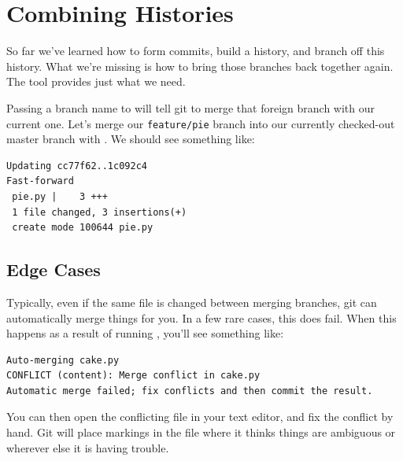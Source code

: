 \documentclass[11pt,letterpaper,twoside]{report}
\begin{document}
\chapter{Combining Histories}

So far we've learned how to form commits, build a history, and branch off this
history. What we're missing is how to bring those branches back together again.
The  tool provides just what we need.

Passing a branch name to  will tell git to merge that foreign
branch with our current one. Let's merge our \texttt{feature/pie} branch into
our currently checked-out master branch with . We
should see something like:

\begin{lstlisting}[numbers=none]
Updating cc77f62..1c092c4
Fast-forward
 pie.py |    3 +++
 1 file changed, 3 insertions(+)
 create mode 100644 pie.py
\end{lstlisting}

\section{Edge Cases}

Typically, even if the same file is changed between merging branches, git can
automatically merge things for you. In a few rare cases, this does fail. When
this happens as a result of running , you'll see something
like:

\begin{lstlisting}[numbers=none]
Auto-merging cake.py
CONFLICT (content): Merge conflict in cake.py
Automatic merge failed; fix conflicts and then commit the result.
\end{lstlisting}

You can then open the conflicting file in your text editor, and fix the conflict
by hand. Git will place markings in the file where it thinks things are
ambiguous or wherever else it is having trouble.
\end{document}
